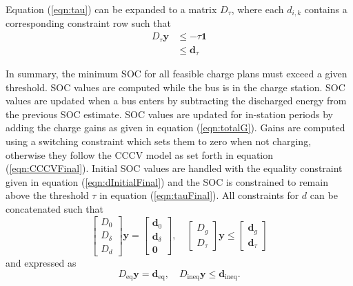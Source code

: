 Equation (\ref{eqn:tau}) can be expanded to a matrix $D_\tau$, where each $d_{i,k}$ contains a corresponding constraint row such that
\begin{equation}\label{eqn:tauFinal}
	\begin{aligned}
		D_\tau\mathbf{y} & \le -\tau\mathbf{1} \\
		       & \le \mathbf{d}_\tau
	\end{aligned}
\end{equation}
\par In summary, the minimum SOC for all feasible charge plans must exceed a given threshold.  SOC values are computed while the bus is in
the charge station.  SOC values are updated when a bus enters by
subtracting the discharged energy from the previous SOC estimate. SOC
values are updated for in-station periods by adding the charge gains
as given in equation (\ref{eqn:totalG}).  Gains are computed using a
switching constraint which sets them to zero when not charging,
otherwise they follow the CCCV model as set forth in equation
(\ref{eqn:CCCVFinal}). Initial SOC values are handled with the equality
constraint given in equation (\ref{eqn:dInitialFinal}) and the SOC is
constrained to remain above the threshold $\tau$ in equation
(\ref{eqn:tauFinal}). All constraints for $d$ can be concatenated such
that
\begin{equation}
	\begin{bmatrix}
	D_0 \\
	D_\delta \\
	D_d
	\end{bmatrix} \mathbf{y} = 
	\begin{bmatrix}
		\mathbf{d}_0 \\
		\mathbf{d}_\delta \\
		\mathbf{0}
		\end{bmatrix}, \quad \begin{bmatrix} D_g \\ D_\tau \end{bmatrix}\mathbf{y} \le \begin{bmatrix} \mathbf{d}_g \\ \mathbf{d}_\tau \end{bmatrix}
\end{equation}
and expressed as 
	\begin{equation}\label{eqn:cSocFinal}
	D_{\text{eq}}\mathbf{y} = \mathbf{d}_{\text{eq}}, \quad D_{\text{ineq}} \mathbf{y} \le \mathbf{d}_{\text{ineq}}.
\end{equation}
